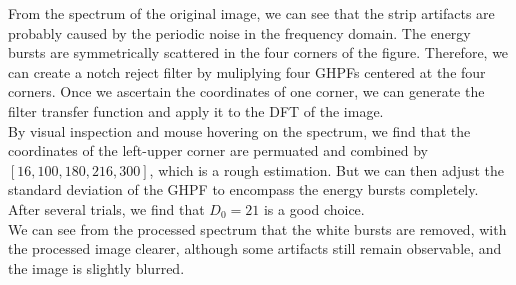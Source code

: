 \documentclass[UTF8]{ctexart}
\begin{document}
From the spectrum of the original image, we can see that the strip artifacts are probably caused by the periodic noise in the frequency domain.
The energy bursts are symmetrically scattered in the four corners of the figure. Therefore, we can create a notch reject filter by muliplying four GHPFs centered at the four corners.
Once we ascertain the coordinates of one corner, we can generate the filter transfer function and apply it to the DFT of the image.\\
By visual inspection and mouse hovering on the spectrum, we find that the coordinates of the left-upper corner are permuated and combined by $[16, 100, 180, 216, 300]$, which is a rough estimation.
But we can then adjust the standard deviation of the GHPF to encompass the energy bursts completely. After several trials, we find that $D_0 = 21$ is a good choice.\\
We can see from the processed spectrum that the white bursts are removed, with the processed image clearer, although some artifacts still remain observable, and the image is slightly blurred.
\end{document}
